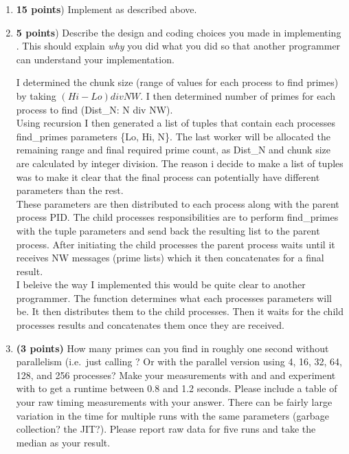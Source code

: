 \documentclass{article}
\newenvironment{answer}
{\color{blue}}
{\normalfont}
\begin{document}
\begin{enumerate}
    \begin{enumerate}
      \item \textbf{15 points})
	Implement  as described above.
      \item \textbf{5 points}) Describe the design and coding choices
	you made in implementing .  This should explain
	\emph{why} you did what you did so that another programmer can
	understand your implementation.

  \begin{answer}
  I determined the chunk size (range of values for each process to find primes) by taking $(Hi - Lo) div NW$.
  I then determined  number of primes for each process to find (Dist\_N: N div NW). \\

  Using recursion I then generated a list of tuples that contain each processes find\_primes parameters \{Lo, Hi, N\}. 
  The last worker will be allocated the remaining range and final required prime count, as Dist\_N and chunk size are calculated by integer division.
  The reason i decide to make a list of tuples was to make it clear that the final process can potentially have different parameters than the rest. \\

  These parameters are then distributed to each process along with the parent process PID.
  The child processes responsibilities are to perform find\_primes with the tuple parameters and send back the resulting list to the parent process.
  After initiating the child processes the parent process waits until it receives NW messages (prime lists) which it then concatenates for a final result. \\

  I beleive the way I implemented this would be quite clear to another programmer.
  The function determines what each processes parameters will be. It then distributes them to the child processes. 
  Then it waits for the child processes results and concatenates them once they are received. 
  \end{answer}

      \item \textbf{(3 points)} How many primes can you find in roughly one second without parallelism (i.e.\ just calling
	?  Or with the parallel version using 4, 16, 32, 64, 128, and 256 processes?
	Make your measurements with  and 
	and experiment with  to get a runtime between 0.8 and 1.2 seconds.
	Please include a table of your raw timing measurements with your answer.
	There can be fairly large variation in the time for multiple runs with the same parameters
	(garbage collection?  the JIT?).  Please report raw data for five runs and take the median
	as your result.


\end{enumerate}
\end{enumerate}
\end{document}
